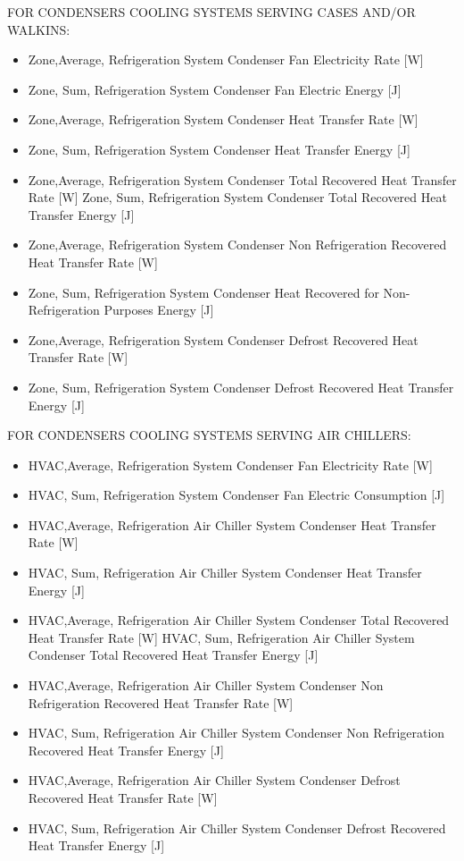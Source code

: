 FOR CONDENSERS COOLING SYSTEMS SERVING CASES AND/OR WALKINS:

\begin{itemize}
\item
  Zone,Average, Refrigeration System Condenser Fan Electricity Rate {[}W{]}
\item
  Zone, Sum, Refrigeration System Condenser Fan Electric Energy {[}J{]}
\item
  Zone,Average, Refrigeration System Condenser Heat Transfer Rate {[}W{]}
\item
  Zone, Sum, Refrigeration System Condenser Heat Transfer Energy {[}J{]}
\item
  Zone,Average, Refrigeration System Condenser Total Recovered Heat Transfer Rate {[}W{]} Zone, Sum, Refrigeration System Condenser Total Recovered Heat Transfer Energy {[}J{]}
\item
  Zone,Average, Refrigeration System Condenser Non Refrigeration Recovered Heat Transfer Rate {[}W{]}
\item
  Zone, Sum, Refrigeration System Condenser Heat Recovered for Non-Refrigeration Purposes Energy {[}J{]}
\item
  Zone,Average, Refrigeration System Condenser Defrost Recovered Heat Transfer Rate {[}W{]}
\item
  Zone, Sum, Refrigeration System Condenser Defrost Recovered Heat Transfer Energy {[}J{]}
\end{itemize}

FOR CONDENSERS COOLING SYSTEMS SERVING AIR CHILLERS:

\begin{itemize}
\item
  HVAC,Average, Refrigeration System Condenser Fan Electricity Rate {[}W{]}
\item
  HVAC, Sum, Refrigeration System Condenser Fan Electric Consumption {[}J{]}
\item
  HVAC,Average, Refrigeration Air Chiller System Condenser Heat Transfer Rate {[}W{]}
\item
  HVAC, Sum, Refrigeration Air Chiller System Condenser Heat Transfer Energy {[}J{]}
\item
  HVAC,Average, Refrigeration Air Chiller System Condenser Total Recovered Heat Transfer Rate {[}W{]} HVAC, Sum, Refrigeration Air Chiller System Condenser Total Recovered Heat Transfer Energy {[}J{]}
\item
  HVAC,Average, Refrigeration Air Chiller System Condenser Non Refrigeration Recovered Heat Transfer Rate {[}W{]}
\item
  HVAC, Sum, Refrigeration Air Chiller System Condenser Non Refrigeration Recovered Heat Transfer Energy {[}J{]}
\item
  HVAC,Average, Refrigeration Air Chiller System Condenser Defrost Recovered Heat Transfer Rate {[}W{]}
\item
  HVAC, Sum, Refrigeration Air Chiller System Condenser Defrost Recovered Heat Transfer Energy {[}J{]}
\end{itemize}

